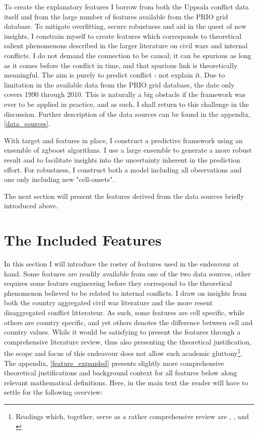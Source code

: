\documentclass[a4paper]{article}
\begin{document}
To create the explanatory features I borrow from both the Uppsala conflict data itself and from the large number of features available from the PRIO grid database. To mitigate overfitting, secure robustness and aid in the quest of new insights, I constrain myself to create features which corresponds to theoretical salient phenomenons described in the larger literature on civil wars and internal conflicts. I do not demand the connection to be causal; it can be spurious as long as it comes before the conflict in time, and that spurious link is theoretically meaningful. The aim is purely to predict conflict - not explain it. Due to limitation in the available data from the PRIO grid database, the date only covers 1990 through 2010. This is naturally a big obstacle if the framework was ever to be applied in practice, and as such, I shall return to this challenge in the discussion. Further description of the data sources can be found in the appendix, \autoref{data_sources}.\par

With target and features in place, I construct a predictive framework using an ensemble of xgboost algorithms. I use a large ensemble to generate a more robust result and to facilitate insights into the uncertainty inherent in the prediction effort. For robustness, I construct both a model including all observations and one only including new "cell-onsets".\par

The next section will present the features derived from the data sources briefly introduced above.\par

\section{The Included Features}

In this section I will introduce the roster of features used in the endeavour at hand. Some features are readily available from one of the two data sources, other requires some feature engineering before they correspond to the theoretical phenomenon believed to be related to internal conflicts. I draw on insights from both the country aggregated civil war literature and the more resent disaggregated conflict litterateur. As such, some features are cell specific, while others are country specific, and yet others denotes the difference between cell and country values. While it would be satisfying to present the features through a comprehensive literature review, thus also presenting the theoretical justification, the scope and focus of this endeavour does not allow such academic gluttony\footnote{Readings which, together, serve as a rather comprehensive review are \cite{Hegre_Sambanis_2006}, \cite{Kalyvas_2007}, \cite{Cederman_Gleditsch_2009} and \cite{Blattman_Miguel_2010}}. The appendix, \autoref{feature_expanded} presents slightly more comprehensive theoretical justifications and background context for all features below along relevant mathematical definitions. Here, in the main text the reader will have to settle for the following overview:\par
\end{document}
